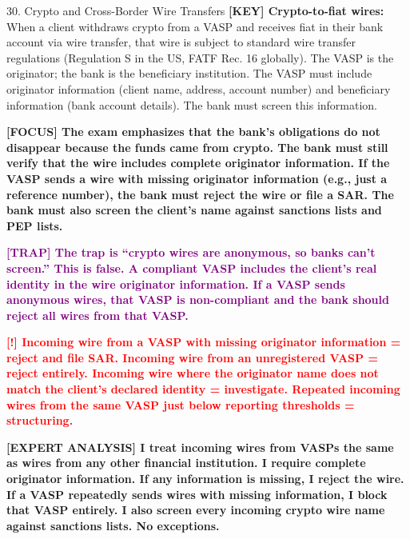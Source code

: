 \documentclass[11pt,a4paper]{beamer}
\newcommand{\redflag}[1]{\textcolor{red}{\textbf{[!] #1}}}
\newcommand{\examfocus}[1]{\textcolor{orange!80!black}{\textbf{[FOCUS] #1}}}
\newcommand{\trap}[1]{\textcolor{purple}{\textbf{[TRAP] #1}}}
\newcommand{\keyterm}[1]{\textcolor{red!80!black}{\textbf{[KEY] #1}}}
\newcommand{\expert}[1]{\textcolor{blue!70!black}{\textbf{[EXPERT ANALYSIS] #1}}}
\begin{document}
	\begin{frame}{30. Crypto and Cross-Border Wire Transfers}
		\tiny
		\keyterm{Crypto-to-fiat wires:} When a client withdraws crypto from a VASP and receives fiat in their bank account via wire transfer, that wire is subject to standard wire transfer regulations (Regulation S in the US, FATF Rec. 16 globally). The VASP is the originator; the bank is the beneficiary institution. The VASP must include originator information (client name, address, account number) and beneficiary information (bank account details). The bank must screen this information.
		
		\vspace{0.1cm}
		\examfocus{The exam emphasizes that the bank's obligations do not disappear because the funds came from crypto. The bank must still verify that the wire includes complete originator information. If the VASP sends a wire with missing originator information (e.g., just a reference number), the bank must reject the wire or file a SAR. The bank must also screen the client's name against sanctions lists and PEP lists.}
		
		\vspace{0.1cm}
		\trap{The trap is “crypto wires are anonymous, so banks can't screen.” This is false. A compliant VASP includes the client's real identity in the wire originator information. If a VASP sends anonymous wires, that VASP is non-compliant and the bank should reject all wires from that VASP.}
		
		\vspace{0.1cm}
		\redflag{Incoming wire from a VASP with missing originator information = reject and file SAR. Incoming wire from an unregistered VASP = reject entirely. Incoming wire where the originator name does not match the client's declared identity = investigate. Repeated incoming wires from the same VASP just below reporting thresholds = structuring.}
		
		\vspace{0.1cm}
		\expert{I treat incoming wires from VASPs the same as wires from any other financial institution. I require complete originator information. If any information is missing, I reject the wire. If a VASP repeatedly sends wires with missing information, I block that VASP entirely. I also screen every incoming crypto wire name against sanctions lists. No exceptions.}
	\end{frame}
	
\end{document}
